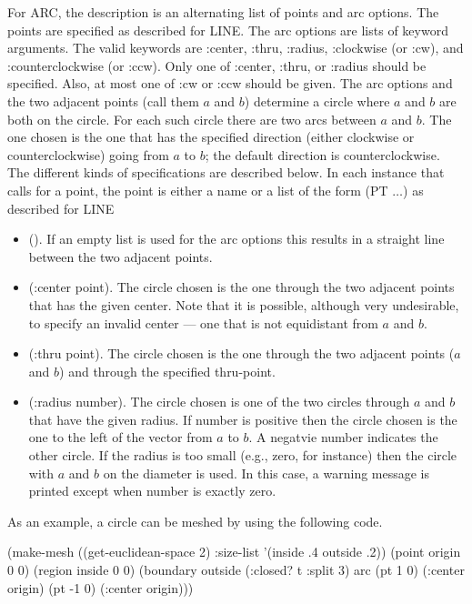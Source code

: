 For {\sf ARC}, the description is an alternating list of points and
arc options.  The points are specified as described for {\sf LINE}.
The arc options are lists of keyword arguments.  The valid keywords
are {\sf :center}, {\sf :thru}, {\sf :radius}, {\sf :clockwise} (or
{\sf :cw}), and {\sf :counterclockwise} (or {\sf :ccw}).  Only one of
{\sf :center}, {\sf :thru}, or {\sf :radius} should be specified.
Also, at most one of {\sf :cw} or {\sf :ccw} should be given.  The arc
options and the two adjacent points (call them $a$ and $b$) determine
a circle where $a$ and $b$ are both on the circle.  For each such
circle there are two arcs between $a$ and $b$.  The one chosen is the
one that has the specified direction (either clockwise or
counterclockwise) going from $a$ to $b$; the default direction is
counterclockwise.  The different kinds of specifications are described
below.  In each instance that calls for a point, the point is either a
name or a list of the form {\sf (PT $\ldots$)} as described for {\sf
LINE}
\begin{itemize}
\item {\sf ()}.
If an empty list is used for the arc options this results in a
straight line between the two adjacent points.
\item {\sf (:center point)}.
The circle chosen is the one through the two adjacent points that has
the given center.  Note that it is possible, although very
undesirable, to specify an invalid center --- one that is not
equidistant from $a$ and $b$.
\item {\sf (:thru point)}.
The circle chosen is the one through the two adjacent points ($a$ and
$b$) and through the specified thru-point.
\item {\sf (:radius number)}.
The circle chosen is one of the two circles through $a$ and $b$ that
have the given radius.  If {\sf number} is positive then the circle
chosen is the one to the left of the vector from $a$ to $b$.  A
negatvie {\sf number} indicates the other circle.  If the radius is
too small (e.g., zero, for instance) then the circle with $a$ and $b$
on the diameter is used.  In this case, a warning message is printed
except when {\sf number} is exactly zero.
\end{itemize}

As an example, a circle can be meshed by using the following code.

\begin{code}
(make-mesh ((get-euclidean-space 2) :size-list '(inside .4 outside .2))
  (point origin 0 0)
  (region inside 0 0)
  (boundary outside (:closed? t :split 3) arc
    (pt 1 0) (:center origin) (pt -1 0) (:center origin)))
\end{code}


